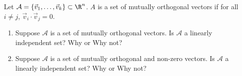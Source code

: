 \begin{exercises}
\begin{problist}
		\prob Let $\mathcal{A}= \{\vec v_{1},\dots , \vec v_{k}\} \subset \R^{n}$.
		$A$ is a set of mutually orthogonal vectors if for all $i \neq j$, $\vec
		v_{i} \cdot \vec v_{j} = 0$.
		\begin{enumerate}
			\item Suppose $\mathcal{A}$ is a set of mutually orthogonal vectors.
				Is $\mathcal{A}$ a linearly independent set? Why or Why not?

			\item Suppose $\mathcal{A}$ is a set of mutually orthogonal and non-zero
				vectors. Is $\mathcal{A}$ a linearly independent set? Why or Why
				not?
		\end{enumerate}
	\end{problist}
\end{exercises}
